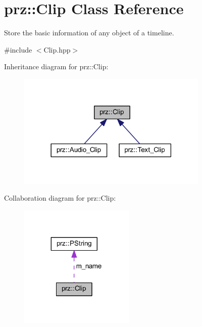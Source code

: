 \hypertarget{classprz_1_1_clip}{}\section{prz\+::Clip Class Reference}
\label{classprz_1_1_clip}


Store the basic information of any object of a timeline.  




{\ttfamily \#include $<$Clip.\+hpp$>$}



Inheritance diagram for prz\+::Clip\+:
\nopagebreak
\begin{figure}[H]
\begin{center}
\leavevmode
\includegraphics[width=258pt]{classprz_1_1_clip__inherit__graph}
\end{center}
\end{figure}


Collaboration diagram for prz\+::Clip\+:
\nopagebreak
\begin{figure}[H]
\begin{center}
\leavevmode
\includegraphics[width=155pt]{classprz_1_1_clip__coll__graph}
\end{center}
\end{figure}
